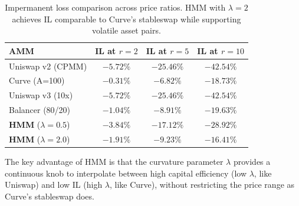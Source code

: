 \begin{table}[H]
\centering
\small
\begin{tabular}{lccc}
\toprule
\textbf{AMM} & \textbf{IL at $r=2$} & \textbf{IL at $r=5$} & \textbf{IL at $r=10$} \\
\midrule
Uniswap v2 (CPMM) & $-5.72\%$ & $-25.46\%$ & $-42.54\%$ \\
Curve (A=100) & $-0.31\%$ & $-6.82\%$ & $-18.73\%$ \\
Uniswap v3 (10x) & $-5.72\%$ & $-25.46\%$ & $-42.54\%$ \\
Balancer (80/20) & $-1.04\%$ & $-8.91\%$ & $-19.63\%$ \\
\textbf{HMM} ($\lambda=0.5$) & $\bm{-3.84\%}$ & $\bm{-17.12\%}$ & $\bm{-28.92\%}$ \\
\textbf{HMM} ($\lambda=2.0$) & $\bm{-1.91\%}$ & $\bm{-9.23\%}$ & $\bm{-16.41\%}$ \\
\bottomrule
\end{tabular}
\caption{Impermanent loss comparison across price ratios. HMM with $\lambda=2$ achieves IL comparable to Curve's stableswap while supporting volatile asset pairs.}
\label{tab:il}
\end{table}

The key advantage of HMM is that the curvature parameter $\lambda$ provides a continuous knob to interpolate between high capital efficiency (low $\lambda$, like Uniswap) and low IL (high $\lambda$, like Curve), without restricting the price range as Curve's stableswap does.

